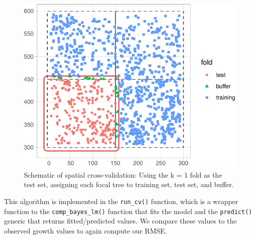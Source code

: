 \documentclass[12pt]{article}
\newenvironment{Shaded}{\begin{snugshade}}{\end{snugshade}}
\newcommand{\CommentTok}[1]{\textcolor[rgb]{0.56,0.35,0.01}{\textit{#1}}}
\newcommand{\DataTypeTok}[1]{\textcolor[rgb]{0.13,0.29,0.53}{#1}}
\newcommand{\KeywordTok}[1]{\textcolor[rgb]{0.13,0.29,0.53}{\textbf{#1}}}
\newcommand{\NormalTok}[1]{#1}
\newcommand{\OperatorTok}[1]{\textcolor[rgb]{0.81,0.36,0.00}{\textbf{#1}}}
\newcommand{\StringTok}[1]{\textcolor[rgb]{0.31,0.60,0.02}{#1}}
\begin{document}
\begin{figure}

{\centering \includegraphics[width=0.66\linewidth]{Figures/scbi-spatial-cross-validation-schematic-1} 

}

\caption{Schematic of spatial cross-validation: Using the k = 1 fold as the test set, assigning each focal tree to training set, test set, and buffer.}\label{fig:scbi-spatial-cross-validation-schematic}
\end{figure}

This algorithm is implemented in the \texttt{run\_cv()} function, which
is a wrapper function to the \texttt{comp\_bayes\_lm()} function that
fits the model and the \texttt{predict()} generic that returns
fitted/predicted values. We compare these values to the observed growth
values to again compute our RMSE.

\begin{Shaded}
\end{Shaded}

\begin{Shaded}
\end{Shaded}
\end{document}
